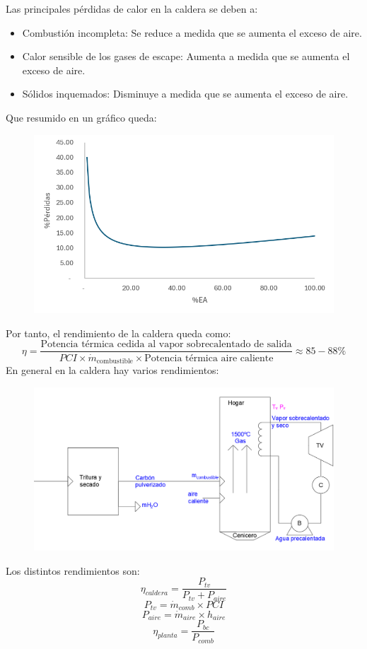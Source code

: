 \begin{enumerate}
\begin{itemize}
				
				Las principales pérdidas de calor en la caldera se deben a:
				\begin{itemize}
					\item Combustión incompleta: Se reduce a medida que se aumenta el exceso de aire.
					\item Calor sensible de los gases de escape: Aumenta a medida que se aumenta el exceso de aire.
					\item Sólidos inquemados: Disminuye a medida que se aumenta el exceso de aire.
				\end{itemize}
				Que resumido en un gráfico queda:
				\begin{figure}[H]
					\centering
					\includegraphics[width=0.5\linewidth]{res/tema2/perdidas}
					\label{fig:perdidas}
				\end{figure}
				Por tanto, el rendimiento de la caldera queda como:
				\[\eta = \frac{\text{Potencia térmica cedida al vapor sobrecalentado de salida}}{PCI \times \dot{m}_\text{combustible} \times \text{Potencia térmica aire caliente}}\approx 85-88\%\]
				En general en la caldera hay varios rendimientos:
				\begin{figure}[H]
					\centering
					\includegraphics[width=0.7\linewidth]{res/tema2/caldera}
					\label{fig:caldera}
				\end{figure}
				Los distintos rendimientos son:
				\[\eta_{caldera}=\frac{P_{tv}}{P_{tv}+P_{aire}}\]
				\[P_{tv}=\dot{m}_{comb}\times PCI\]
				\[P_{aire}=\dot{m}_{aire}\times h_{aire}\]
				\[\eta_{planta}=\frac{P_{bc}}{P_{comb}}\]
		\end{itemize}
\end{enumerate}
